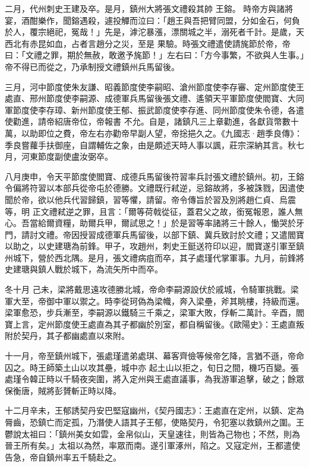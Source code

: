 \begin{pinyinscope}
 二月，代州刺史王建及卒。是月，鎮州大將張文禮殺其帥
 王鎔。
 時帝方與諸將宴，酒酣樂作，聞鎔遇殺，遽投觶而泣曰：「趙王與吾把臂同盟，分如金石，何負於人，覆宗絕祀，冤哉！」先是，滹沱暴漲，漂關城之半，溺死者千計。是歲，天西北有赤昆如血，占者言趙分之災，至是
 果驗。時張文禮遣使請旄節於帝，帝曰：「文禮之罪，期於無赦，敢邀予旄節！」左右曰：「方今事繁，不欲與人生事。」帝不得已而從之，乃承制授文禮鎮州兵馬留後。



 三月，河中節度使朱友謙、昭義節度使李嗣昭、滄州節度使李存審、定州節度使王處直、邢州節度使李嗣源、成德軍兵馬留後張文禮、遙領天平軍節度使閻寶、大同軍節度使李存璋、新州節度使王郁、振武節度使李存進、同州節度使朱令德，各遣使勸進，請帝紹唐帝位，帝報書
 不允。自是，諸鎮凡三上章勸進，各獻貨幣數十萬，以助即位之費，帝左右亦勸帝早副人望，帝捴挹久之。《九國志·趙季良傳》：季良嘗蘿手扶御座，自謂輔佐之象，由是頗述天時人事以諷，莊宗深納其言。秋七月，河東節度副使盧汝弼卒。



 八月庚申，令天平節度使閻寶、成德兵馬留後符習率兵討張文禮於鎮州。初，王鎔令偏將符習以本部兵從帝屯於德勝。文禮既行弒逆，忌鎔故將，多被誅戮，因遣使聞於帝，欲以他兵代習歸鎮，習等懼，請留。帝令傳旨於習及別將趙仁貞、烏震等，明
 正文禮弒逆之罪，且言：「爾等荷戟從征，蓋君父之故，銜冤報恩，誰人無心。吾當給爾資糧，助爾兵甲，爾試思之！」於是習等率諸將三十餘人，慟哭於牙門，請討文禮。帝因授習成德軍兵馬留後，以部下鎮、冀兵致討於文禮；又遣閻寶以助之，以史建瑭為前鋒。甲子，攻趙州，刺史王鋌送符印以迎，閻寶遂引軍至鎮州城下，營於西北隅。是月，張文禮病疽而卒，其子處瑾代掌軍事。九月，前鋒將史建瑭與鎮人戰於城下，為流矢所中而卒。



 冬十月
 己未，梁將戴思遠攻德勝北城，帝命李嗣源設伏於戚城，令騎軍挑戰。梁軍大至，帝御中軍以禦之。時李從珂偽為梁幟，奔入梁壘，斧其眺樓，持級而還。梁軍愈恐，步兵漸至，李嗣源以鐵騎三千乘之，梁軍大敗，俘斬二萬計。辛酉，閻寶上言，定州節度使王處直為其子都幽於別室，都自稱留後。《歐陽史》：王處直叛附於契丹，其子都幽處直以來附。



 十一月，帝至鎮州城下，張處瑾遣弟處琪、幕客齊儉等候帝乞降，言猶不遜，帝命囚之。時王師築土山以攻其壘，城中亦
 起土山以拒之，旬日之間，機巧百變。張處瑾令韓正時以千騎夜突圍，將入定州與王處直議事，為我游軍追擊，破之；餘眾保衡唐，賊將彭贇斬正時以降。



 十二月辛未，王郁誘契丹安巴堅寇幽州，《契丹國志》：王處直在定州，以鎮、定為脣齒，恐鎮亡而定孤，乃潛使人語其子王郁，使賂契丹，令犯塞以救鎮州之圍。王鬱說太祖曰：「鎮州美女如雲，金帛似山，天皇速往，則皆為己物也；不然，則為晉王所有矣。」太祖以為然，率眾而南。遂引軍涿州，陷之。又寇定州，王都遣使告急，帝自鎮州率五千騎赴之。




\end{pinyinscope}
